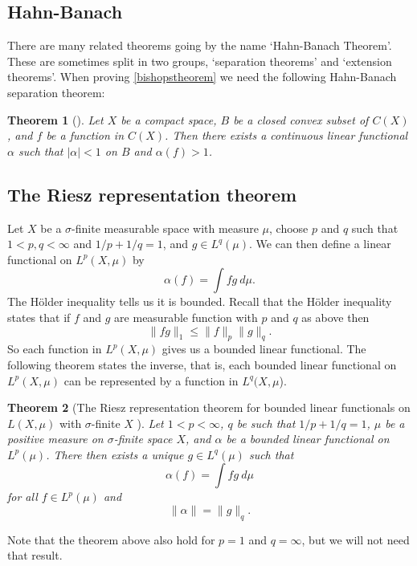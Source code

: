 \documentclass[a4paper,12pt,twoside,BCOR=10mm]{scrbook}
\newtheorem{theorem}{Theorem}[section]
\theoremstyle{definition}
\theoremstyle{definition}
\theoremstyle{definition}
\begin{document}
\subsection{Hahn-Banach}
There are many related theorems going by the name `Hahn-Banach Theorem'.
These are sometimes split in two groups, `separation theorems' and `extension theorems'.
When proving \ref{bishopstheorem} we need the following Hahn-Banach separation theorem:
\begin{theorem}[\citep{pryce}]
Let
	$X$ be a compact space,
	$B$ be a closed convex subset of $C(X)$,
	and $f$ be a function in $C(X)$.
Then there exists a continuous linear functional $\alpha$ such that $|\alpha| < 1$ on $B$ and $\alpha(f) > 1$.
\end{theorem}
\subsection{The Riesz representation theorem}
Let
	$X$ be a $\sigma$-finite measurable space with measure $\mu$,
	choose $p$ and $q$ such that $1 < p, q < \infty$ and $1/p + 1/q = 1$,
	and $g \in L^q(\mu)$.
We can then define a linear functional on $L^p(X, \mu)$ by
\[
	\alpha(f) = \int fg\ d\mu.
\]
The Hölder inequality tells us it is bounded.
Recall that the Hölder inequality states that if $f$ and $g$ are measurable function with $p$ and $q$ as above then
\[
	\|fg\|_1 \leq \|f\|_p\|g\|_q.
\]
So each function in $L^p(X, \mu)$ gives us a bounded linear functional.
The following theorem states the inverse, that is, each bounded linear functional on $L^p(X, \mu)$ can be represented by a function in $L^q(X, \mu$).
\begin{theorem}[The Riesz representation theorem for bounded linear functionals on $L(X, \mu)$ with $\sigma$-finite $X$ \citep{rudin2}]
Let $1 < p < \infty$,
	$q$ be such that $1/p + 1/q = 1$,
	$\mu$ be a positive measure on $\sigma$-finite space $X$,
	and $\alpha$ be a bounded linear functional on $L^p(\mu)$.
There then exists a unique $g \in L^q(\mu)$ such that
\[
	\alpha(f) = \int fg\ d\mu
\]
for all $f \in L^p(\mu)$ and
\[
	\|\alpha\| = \|g\|_q.
\]
\end{theorem}
Note that the theorem above also hold for $p = 1$ and $q = \infty$, but we will not need that result.
\end{document}
